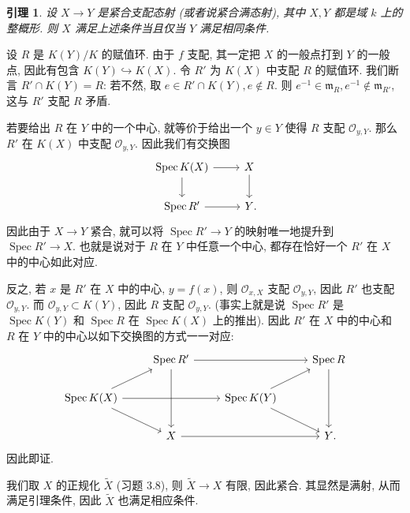 \documentclass{article}
\theoremstyle{exercise}
\theoremstyle{plain}
\newtheorem*{lemma*}{引理}
\theoremstyle{remark}
\newenvironment{proofc}{\proof}{\endproof}
\def\gm{\mathfrak{m}}
\def\cO{\mathscr{O}}
\def\Spec{\operatorname{Spec}}
\begin{document}
\begin{proofc}
\begin{enumerate}[label=(\alph*)]
          \begin{lemma*}
            设 $X \to Y$ 是紧合支配态射 (或者说紧合满态射),
            其中 $X, Y$ 都是域 $k$ 上的整概形.
            则 $X$ 满足上述条件当且仅当 $Y$ 满足相同条件.
          \end{lemma*}

          \begin{proofc}
            设 $R$ 是 $K(Y) / K$ 的赋值环.
            由于 $f$ 支配, 其一定把 $X$ 的一般点打到 $Y$ 的一般点,
            因此有包含 $K(Y) \hookrightarrow K(X)$.
            令 $R'$ 为 $K(X)$ 中支配 $R$ 的赋值环.
            我们断言 $R' \cap K(Y) = R$: 若不然, 取 $e \in R' \cap K(Y), e \notin R$.
            则 $e^{-1} \in \gm_R, e^{-1} \notin \gm_{R'}$, 这与 $R'$ 支配 $R$ 矛盾.

            若要给出 $R$ 在 $Y$ 中的一个中心, 就等价于给出一个 $y \in Y$
            使得 $R$ 支配 $\cO_{y, Y}$. 那么 $R'$ 在 $K(X)$ 中支配 $\cO_{y, Y}$.
            因此我们有交换图
            \[\begin{tikzcd}
                \Spec K(X) \ar[r] \ar[d] & X \ar[d] \\
                \Spec R' \ar[r]          & Y\rlap{.}
              \end{tikzcd}\]
            因此由于 $X \to Y$ 紧合, 就可以将 $\Spec R' \to Y$ 的映射唯一地提升到 $\Spec R' \to X$.
            也就是说对于 $R$ 在 $Y$ 中任意一个中心, 都存在恰好一个 $R'$ 在 $X$ 中的中心如此对应.

            反之, 若 $x$ 是 $R'$ 在 $X$ 中的中心, $y = f(x)$,
            则 $\cO_{x, X}$ 支配 $\cO_{y, Y}$, 因此 $R'$ 也支配 $\cO_{y, Y}$.
            而 $\cO_{y, Y} \subset K(Y)$, 因此 $R$ 支配 $\cO_{y, Y}$.
            (事实上就是说 $\Spec R'$ 是 $\Spec K(Y)$ 和 $\Spec R$ 在 $\Spec K(X)$ 上的推出).
            因此 $R'$ 在 $X$ 中的中心和 $R$ 在 $Y$ 中的中心以如下交换图的方式一一对应:
            \[\begin{tikzcd}
                & \Spec R' \ar[rr] \ar[dd] & & \Spec R \ar[dd] \\
                \Spec K(X) \ar[ru] \ar[rd] \ar[rr] & & \Spec K(Y) \ar[ru] \ar[rd] & \\
                & X \ar[rr] & & Y\rlap{.}
              \end{tikzcd}\]
            因此即证.
          \end{proofc}

          我们取 $X$ 的正规化 $\tilde{X}$ (习题 3.8),
          则 $\tilde{X} \to X$ 有限, 因此紧合. 其显然是满射,
          从而满足引理条件, 因此 $\tilde{X}$ 也满足相应条件.


\end{enumerate}
\end{proofc}
\end{document}
